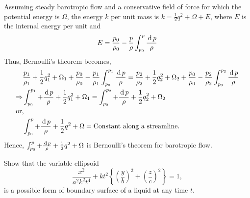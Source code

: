 \documentclass[12pt]{article}
\begin{document}
\begin{soln}
    Assuming steady barotropic flow and a conservative field of force for which the potential energy is $ \Omega $, the energy $ k $ per unit mass is $ k=\frac{1}{2}q^2+\Omega+E $, where $ E $ is the internal energy per unit and 
    \[ 
        E=\frac{p_0}{\rho_0}-\frac{p}{\rho} \int_{p_0}^p \frac{\,\mathrm{d}\, p}{\rho}
    \]
    Thus, Bernoulli's theorem becomes,
    \begin{align*}
        &\frac{p_1}{\rho_1}+\frac{1}{2}q_1^2+\Omega_1+\frac{p_0}{\rho_0}-\frac{p_1}{\rho_1}\int_{p_0}^{p_1}\frac{\,\mathrm{d}\, p}{\rho}=\frac{p_2}{\rho_2}+\frac{1}{2}q_2^2+\Omega_2+\frac{p_0}{\rho_0}-\frac{p_2}{\rho_2}\int_{p_0}^{p_2}\frac{\,\mathrm{d}\, p}{\rho}\\
        \Rightarrow & \int_{p_0}^{p_1}+\frac{\,\mathrm{d}\, p}{\rho}+\frac{1}{2}q_1^2+\Omega_1=\int_{p_0}^{p_2}+\frac{\,\mathrm{d}\, p}{\rho}+\frac{1}{2}q_2^2+\Omega_2\\
        \intertext{or,}
        &\int_{p_0}^{p}+\frac{\,\mathrm{d}\, p}{\rho}+\frac{1}{2}q^2+\Omega=\text{Constant along a streamline.}
    \end{align*}
    Hence, $ \int_{p_0}^{p}+\frac{\,\mathrm{d}\, p}{\rho}+\frac{1}{2}q^2+\Omega $ is Bernoulli's theorem for barotropic flow.
\end{soln}
\newpage
\begin{prob}
    Show that the variable ellipsoid 
    \[
        \frac{x^2}{a^2k^2t^4}+kt^2\left\{ \left( \frac{y}{b} \right)^2+\left( \frac{z}{c} \right)^2 \right\}=1,
    \]
    is a possible form of boundary surface of a liquid at any time $ t $.
\end{prob}
\end{document}
